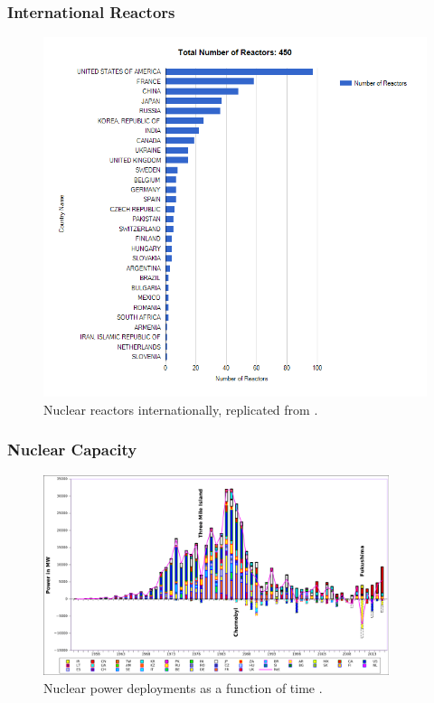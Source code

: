 \begin{frame}
  \frametitle{International Reactors}
  \begin{figure}[htbp!]
    \begin{center}
      \includegraphics[height=0.8\textheight]{./images/reactors-by-country}
    \end{center}
          \caption{Nuclear reactors internationally, replicated from 
          \cite{iaea_nuclear_2019}.}
    \label{fig:nuc-nations}
  \end{figure}
\end{frame}
\begin{frame}
  \frametitle{Nuclear Capacity}
  \begin{figure}[htbp!]
    \begin{center}
      \includegraphics[width=0.9\textwidth]{./images/nuclear-nations-deployments.png}
    \end{center}
          \caption{Nuclear power deployments as a function of time
          \cite{torsch_global_2013}.}
    \label{fig:nuc-nations-deployments}
\end{figure}
\end{frame}

